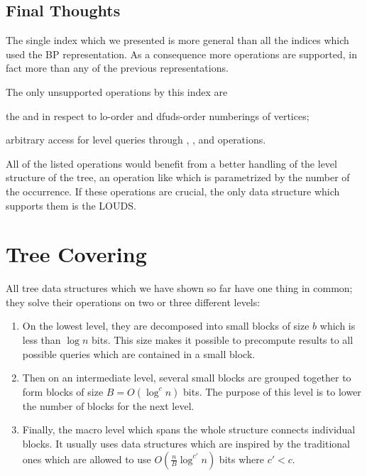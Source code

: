 \subsection{Final Thoughts}

The single index which we presented is more general than all the indices which used the BP representation.
As a consequence more operations are supported, in fact more than any of the previous representations.

The only unsupported operations by this index are
\begin{enuminline}
	\item the \rank{} and \select{} in respect to lo-order and dfuds-order numberings of vertices;
	\item arbitrary access for level queries through \levelSize{}, \levelRank{}, and \levelSelect{} operations.
\end{enuminline}

All of the listed operations would benefit from a better handling of the level structure of the tree, an operation like \fwdSearch{} which is parametrized by the number of the occurrence.
If these operations are crucial, the only data structure which supports them is the LOUDS.


\section{Tree Covering}\label{s:TC}

All tree data structures which we have shown so far have one thing in common; they solve their operations on two or three different levels:
\begin{enumerate}
	\item On the lowest level, they are decomposed into small blocks of size $b$ which is less than $\log n$ bits.
	This size makes it possible to precompute results to all possible queries which are contained in a small block.
	
	\item Then on an intermediate level, several small blocks are grouped together to form blocks of size $B = O(\log^c n)$ bits.
	The purpose of this level is to lower the number of blocks for the next level.
	
	\item Finally, the macro level which spans the whole structure connects individual blocks.
	It usually uses data structures which are inspired by the traditional ones which are allowed to use $O(\frac{n}{B} \log^{c'} n)$ bits where $c' < c$.
\end{enumerate}

